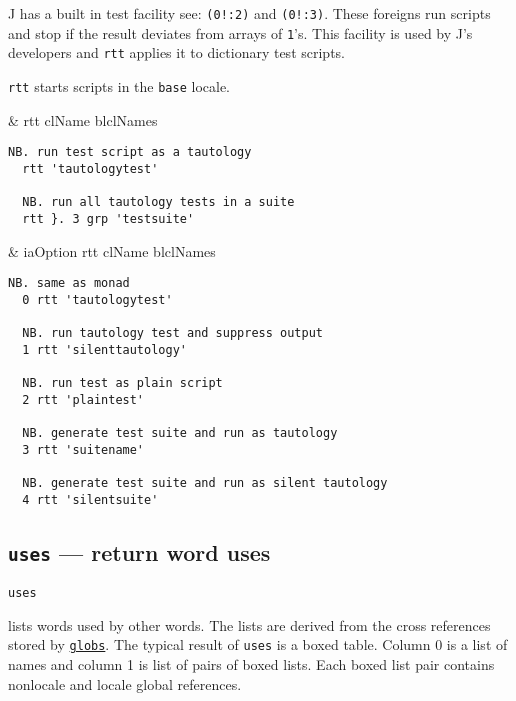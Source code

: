 J has a built in test facility see: \verb|(0!:2)| and \verb|(0!:3)|.  
These foreigns run scripts and stop if the result deviates 
from arrays of \texttt{1}'s.  This facility is used by J's developers 
and \texttt{rtt} applies it to dictionary test scripts.  
  
\texttt{rtt} starts scripts in the \texttt{base} locale. 

\begin{wordhead}
\monad & rtt clName \argsep blclNames \\
\end{wordhead}
\begin{lstlisting}[frame=single,framerule=0pt] 
  NB. run test script as a tautology
  rtt 'tautologytest'    
  
  NB. run all tautology tests in a suite 
  rtt }. 3 grp 'testsuite'  
\end{lstlisting}  

\begin{wordhead}
\dyad & iaOption rtt clName \argsep blclNames \\
\end{wordhead}
\begin{lstlisting}[frame=single,framerule=0pt] 
  NB. same as monad
  0 rtt 'tautologytest'    
  
  NB. run tautology test and suppress output 
  1 rtt 'silenttautology'  
  
  NB. run test as plain script
  2 rtt 'plaintest'        
  
  NB. generate test suite and run as tautology 
  3 rtt 'suitename'  
   
  NB. generate test suite and run as silent tautology      
  4 rtt 'silentsuite'      
\end{lstlisting}                  


\subsection{\texttt{uses} --- return word uses} 

\hypertarget{il:uses}{\texttt{uses}} lists words used by other words. The lists 
are derived from the cross references stored 
by \hyperlink{il:globs}{\texttt{globs}}. The typical result
 of \texttt{uses} is a boxed table. Column 0 is a list of names and column 1 is list 
 of pairs of boxed lists. Each boxed list pair contains nonlocale 
 and locale global references. 

